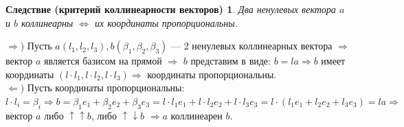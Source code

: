 \newtheorem*{cor2_2}{Следствие (критерий коллинеарности векторов)}\begin{cor2_2}Два ненулевых вектора $a$ и $b$ коллинеарны $\Longleftrightarrow$ их координаты пропорциональны.
\end{cor2_2}\begin{Proof}
	$\Rightarrow)$ Пусть $a(l_1, l_2, l_3), b(\beta_1, \beta_2, \beta_3)$ --- 2 ненулевых коллинеарных вектора $\Rightarrow$ вектор 
	$a$ является
	базисом на прямой $\Rightarrow$ $b$ представим в виде: $b = la \Rightarrow b$ имеет координаты $(l\cdot l_1, l\cdot l_2, l\cdot l_3)\Rightarrow$
	координаты пропорциональны.\\
	$\Leftarrow)$ Пусть координаты пропорциональны: $l\cdot l_i = \beta_i \Rightarrow b = \beta_1e_1 + \beta_2e_2 + \beta_3 e_3 = l\cdot l_1 e_1 + l\cdot l_2 e_2 + l\cdot l_3 e_3 =
	l\cdot(l_1e_1 + l_2e_2 + l_3e_3) = la \Rightarrow$ вектор $a$ либо $\uparrow \uparrow b$, либо $\uparrow\downarrow b$ $\Rightarrow a$ коллинеарен $b$.
\end{Proof}


